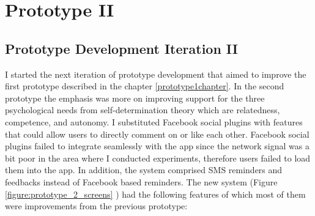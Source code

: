 
\chapter{Prototype II} %

\label{prototype2chapter} %


\section{Prototype Development Iteration II}
I started the next iteration of prototype development that aimed to improve the first prototype described in the chapter \ref{prototype1chapter}. In the second prototype the emphasis was more on improving support for the three psychological needs from self-determination theory \citep{ryan2000:self} which are relatedness, competence, and autonomy. I substituted Facebook social plugins with features that could allow users to directly comment on or like each other. Facebook social plugins failed to integrate seamlessly with the app since the network signal was a bit poor in the area where I conducted experiments, therefore users failed to load them into the app. In addition, the system comprised SMS reminders and feedbacks instead of Facebook based reminders. The new system (Figure \ref{figure:prototype_2_screens} ) had the following features of which most of them were improvements from the previous prototype:
